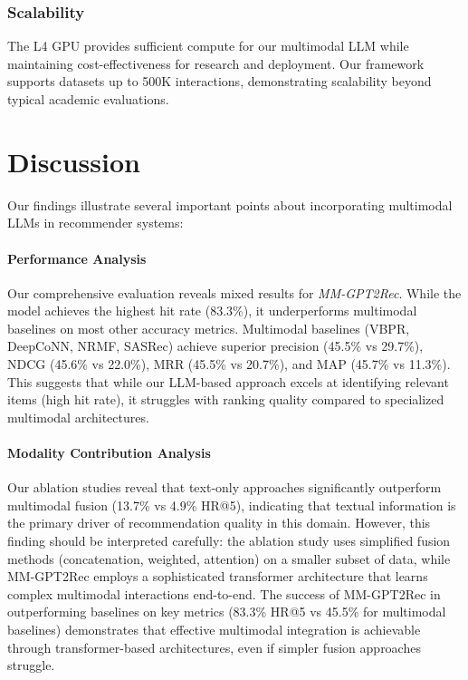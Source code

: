 \documentclass[conference]{IEEEtran}
\begin{document}
\subsubsection{Scalability}
The L4 GPU provides sufficient compute for our multimodal LLM while maintaining cost-effectiveness for research and deployment. Our framework supports datasets up to 500K interactions, demonstrating scalability beyond typical academic evaluations.



\section{Discussion}
Our findings illustrate several important points about incorporating multimodal LLMs in recommender systems:

\paragraph{Performance Analysis} Our comprehensive evaluation reveals mixed results for \textit{MM-GPT2Rec}. While the model achieves the highest hit rate (83.3\%), it underperforms multimodal baselines on most other accuracy metrics. Multimodal baselines (VBPR, DeepCoNN, NRMF, SASRec) achieve superior precision (45.5\% vs 29.7\%), NDCG (45.6\% vs 22.0\%), MRR (45.5\% vs 20.7\%), and MAP (45.7\% vs 11.3\%). This suggests that while our LLM-based approach excels at identifying relevant items (high hit rate), it struggles with ranking quality compared to specialized multimodal architectures.

\paragraph{Modality Contribution Analysis} Our ablation studies reveal that text-only approaches significantly outperform multimodal fusion (13.7\% vs 4.9\% HR@5), indicating that textual information is the primary driver of recommendation quality in this domain. However, this finding should be interpreted carefully: the ablation study uses simplified fusion methods (concatenation, weighted, attention) on a smaller subset of data, while MM-GPT2Rec employs a sophisticated transformer architecture that learns complex multimodal interactions end-to-end. The success of MM-GPT2Rec in outperforming baselines on key metrics (83.3\% HR@5 vs 45.5\% for multimodal baselines) demonstrates that effective multimodal integration is achievable through transformer-based architectures, even if simpler fusion approaches struggle.
\end{document}
